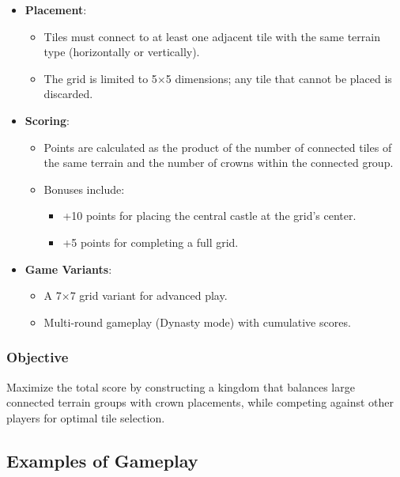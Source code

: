 \documentclass[conference]{IEEEtran}
\begin{document}
\begin{itemize}
    \item \textbf{Placement}:
          \begin{itemize}
              \item Tiles must connect to at least one adjacent tile with the same terrain type
                    (horizontally or vertically).
              \item The grid is limited to 5$\times$5 dimensions; any tile that cannot be placed is
                    discarded.
          \end{itemize}

    \item \textbf{Scoring}:
          \begin{itemize}
              \item Points are calculated as the product of the number of connected tiles of the
                    same terrain and the number of crowns within the connected group.
              \item Bonuses include:
                    \begin{itemize}
                        \item +10 points for placing the central castle at the grid's center.
                        \item +5 points for completing a full grid.
                    \end{itemize}
          \end{itemize}

    \item \textbf{Game Variants}:
          \begin{itemize}
              \item A 7$\times$7 grid variant for advanced play.
              \item Multi-round gameplay (Dynasty mode) with cumulative scores.
          \end{itemize}
\end{itemize}

\subsubsection{Objective}

Maximize the total score by constructing a kingdom that balances large
connected terrain groups with crown placements, while competing against other
players for optimal tile selection.

\subsection{Examples of Gameplay}
\end{document}
